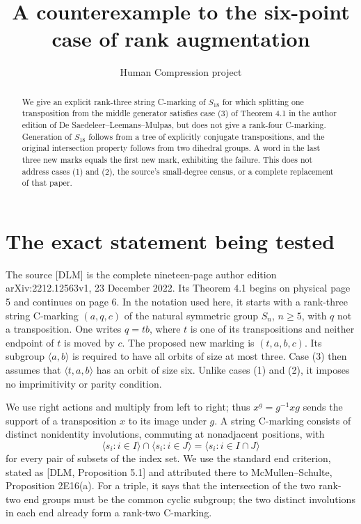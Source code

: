 \documentclass[a4paper,11pt]{article}
\title{A counterexample to the six-point case of rank augmentation}
\author{Human Compression project}\date{}
\newcommand{\gen}[1]{\langle#1\rangle}
\begin{document}
\maketitle
\begin{abstract}
We give an explicit rank-three string C-marking of $S_{18}$ for which
splitting one transposition from the middle generator satisfies case (3)
of Theorem 4.1 in the author edition of De Saedeleer--Leemans--Mulpas,
but does not give a rank-four C-marking. Generation of $S_{18}$ follows
from a tree of explicitly conjugate transpositions, and the original
intersection property follows from two dihedral groups. A word in the
last three new marks equals the first new mark, exhibiting the failure.
This does not address cases (1) and (2), the source's small-degree census,
or a complete replacement of that paper.
\end{abstract}

\section{The exact statement being tested}
The source [DLM] is the complete nineteen-page author edition
arXiv:2212.12563v1, 23 December 2022. Its Theorem 4.1 begins on physical
page 5 and continues on page 6. In the notation used here, it starts with
a rank-three string C-marking $(a,q,c)$ of the natural symmetric group
$S_n$, $n\geq5$, with $q$ not a transposition. One writes $q=tb$, where
$t$ is one of its transpositions and neither endpoint of $t$ is moved by
$c$. The proposed new marking is $(t,a,b,c)$. Its subgroup $\gen{a,b}$
is required to have all orbits of size at most three. Case (3) then assumes
that $\gen{t,a,b}$ has an orbit of size six. Unlike cases (1) and (2),
it imposes no imprimitivity or parity condition.

We use right actions and multiply from left to right; thus
$x^g=g^{-1}xg$ sends the support of a transposition $x$ to its image under
$g$. A string C-marking consists of distinct nonidentity involutions,
commuting at nonadjacent positions, with
\[
 \gen{s_i:i\in I}\cap\gen{s_i:i\in J}
 =\gen{s_i:i\in I\cap J}
\]
for every pair of subsets of the index set. We use the standard end
criterion, stated as [DLM, Proposition 5.1] and attributed there to
McMullen--Schulte, Proposition 2E16(a). For a triple, it says that the
intersection of the two rank-two end groups must be the common cyclic
subgroup; the two distinct involutions in each end already form a
rank-two C-marking.
\end{document}
